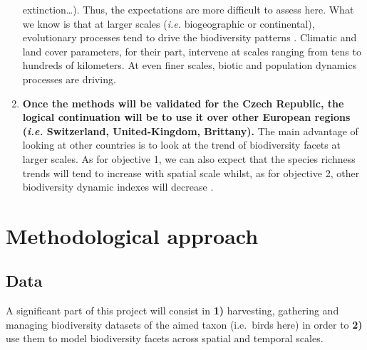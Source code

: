 \documentclass[
  12pt,
  oneside]{report}
\begin{document}
\begin{enumerate}
  extinction\ldots). Thus, the expectations are more difficult to assess here. What we know is that at
  larger scales (\emph{i.e.} biogeographic or continental), evolutionary processes tend to drive the
  biodiversity patterns \autocite{keil_downscaling_2014}. Climatic and land cover parameters, for their part,
  intervene at scales ranging from tens to hundreds of kilometers. At even finer scales, biotic
  and population dynamics processes are driving.
\item
  \textbf{Once the methods will be validated for the Czech Republic, the logical continuation will be to use it over other European regions (\textit{i.e.} Switzerland, United-Kingdom, Brittany).} The main advantage of looking at other countries is to look at the trend of
  biodiversity facets at larger scales. As for objective 1, we can also expect that the species
  richness trends will tend to increase with spatial scale \autocite{chase_species_2019} whilst, as for
  objective 2, other biodiversity dynamic indexes will decrease \autocite{jarzyna_spatial_2015}.
\end{enumerate}

\hypertarget{method}{%
\chapter{Methodological approach}\label{method}}

\hypertarget{data}{%
\section{Data}\label{data}}

A significant part of this project will consist in \textbf{1)} harvesting, gathering and managing biodiversity
datasets of the aimed taxon (i.e.~birds here) in order to \textbf{2)} use them to model biodiversity facets
across spatial and temporal scales.
\end{document}
